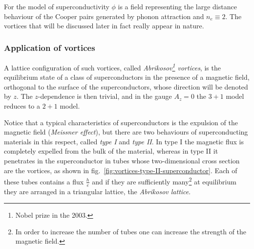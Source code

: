 \documentclass[../main/main.tex]{subfiles}
\begin{document}
For the model of superconductivity $\phi$ is a field representing the large distance behaviour of the Cooper pairs generated by phonon attraction and $n_e\equiv2$. 
The vortices that will be discussed later in fact really appear in nature. 

\subsubsection{Application of vortices}

A lattice configuration of such vortices, called \emph{Abrikosov\footnote{Nobel prize in the 2003.} vortices}, is the equilibrium state of a class of superconductors in the presence of a magnetic field, orthogonal to the surface of the superconductors, whose direction will be denoted by $z$. The $z$-dependence is then trivial, and in the gauge $A_z=0$ the $3+1$ model reduces to a $2+1$ model. 

Notice that a typical characteristics of superconductors is the expulsion of the magnetic field (\emph{Meissner effect}), but there are two behaviours of superconducting materials in this respect, called \emph{type I} and \emph{type II}. In type I the magnetic flux is completely expelled from the bulk of the material, whereas in type II it penetrates in the superconductor in tubes whose two-dimensional cross section are the vortices, as shown in fig.~\ref{fig:vortices-type-II-superconductor}. Each of these tubes contains a flux $\frac he$ and if they are sufficiently many\footnote{In order to increase the number of tubes one can increase the strength of the magnetic field.} at equilibrium they are arranged in a triangular lattice, the \emph{Abrikosov lattice}. 
\end{document}
